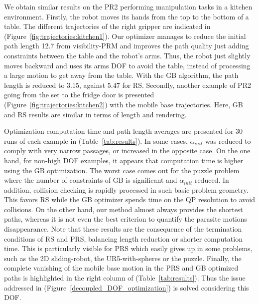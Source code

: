 \documentclass{tADR2e}
\begin{document}
We obtain similar results on the PR2 performing manipulation tasks 
in a kitchen environment.
Firstly, the robot moves its hands from the top to the bottom of a table.
The different trajectories of the right gripper are indicated in (Figure~\ref{fig:trajectories:kitchen1}).
Our optimizer manages to reduce the initial path length 12.7 from visibility-PRM 
and improves the path quality 
just adding constraints between the table and the 
robot's arms. Thus, the robot just slightly moves 
backward and uses its arms DOF to avoid the table, instead of 
processing a large motion to get away from the table. With the GB algorithm, the path length is 
reduced to 3.15, against 5.47 for RS.
Secondly, another example of PR2 going from the set to the fridge 
door is presented (Figure~\ref{fig:trajectories:kitchen2}) with the mobile base
trajectories. Here, GB and RS results are similar in terms of length and rendering.

\vspace{0.4cm}

Optimization computation time and path length averages are presented for 30 runs of 
each example in (Table~\ref{tab:results}). In some cases, $\alpha_{init}$ was 
reduced to comply with very narrow passages, or increased in the opposite case. 
On the one hand, for non-high DOF examples, it appears that computation time is higher using the GB 
optimization. The worst case comes out for the puzzle problem where the number of 
constraints of GB is significant and $\alpha_{init}$ reduced. 
In addition, collision checking is rapidly processed in such basic problem geometry. This favors RS while the GB optimizer spends time on the QP resolution to avoid collisions.
On the other hand, our method almost always provides the shortest paths, whereas it 
is not even the best criterion to quantify the parasite motions disappearance.
Note that these results are the consequence of the termination conditions of RS and PRS, balancing length reduction or shorter computation time. 
This is particularly visible for PRS which 
easily gives up in some problems, such as the 2D sliding-robot, the 
UR5-with-spheres or the puzzle.
Finally, the complete vanishing of the mobile base motion in the PRS and GB 
optimized paths is highlighted in the right column of (Table~\ref{tab:results}). 
Thus the issue addressed in (Figure~\ref{decoupled_DOF_optimization}) is 
solved considering this DOF.
\end{document}
